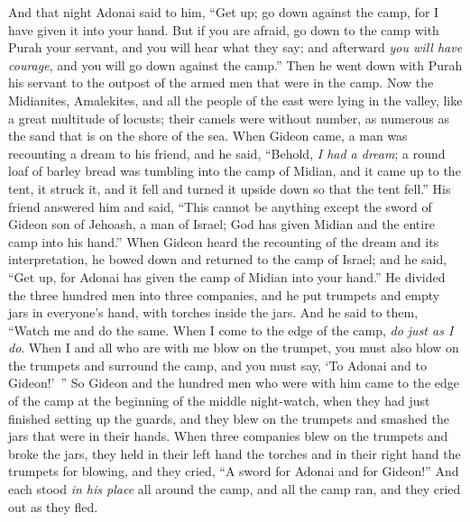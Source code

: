 \begin{biblechapter}
\verse And that night Adonai said to him, “Get up; go down against the camp, for I have given it into your hand.
\verse But if you are afraid, go down to the camp with Purah your servant,
\verse and you will hear what they say; and afterward \textit{you will have courage}, and you will go down against the camp.” Then he went down with Purah his servant to the outpost of the armed men that were in the camp.
\verse Now the Midianites, Amalekites, and all the people of the east were lying in the valley, like a great multitude of locusts; their camels were without number, as numerous as the sand that is on the shore of the sea.
\verse When Gideon came, a man was recounting a dream to his friend, and he said, “Behold, \textit{I had a dream}; a round loaf of barley bread was tumbling into the camp of Midian, and it came up to the tent, it struck it, and it fell and turned it upside down so that the tent fell.”
\verse His friend answered him and said, “This cannot be anything except the sword of Gideon son of Jehoash, a man of Israel; God has given Midian and the entire camp into his hand.”
\verse When Gideon heard the recounting of the dream and its interpretation, he bowed down and returned to the camp of Israel; and he said, “Get up, for Adonai has given the camp of Midian into your hand.”
\verse He divided the three hundred men into three companies, and he put trumpets and empty jars in everyone’s hand, with torches inside the jars.
\verse And he said to them, “Watch me and do the same. When I come to the edge of the camp, \textit{do just as I do}.
\verse When I and all who are with me blow on the trumpet, you must also blow on the trumpets and surround the camp, and you must say, ‘To Adonai and to Gideon!’ ”
\verse So Gideon and the hundred men who were with him came to the edge of the camp at the beginning of the middle night-watch, when they had just finished setting up the guards, and they blew on the trumpets and smashed the jars that were in their hands.
\verse When three companies blew on the trumpets and broke the jars, they held in their left hand the torches and in their right hand the trumpets for blowing, and they cried, “A sword for Adonai and for Gideon!”
\verse And each stood \textit{in his place} all around the camp, and all the camp ran, and they cried out as they fled.

\end{biblechapter}
